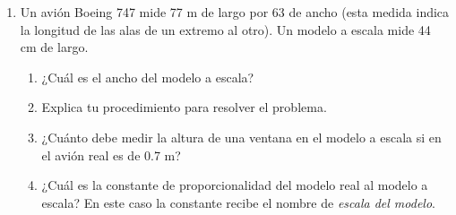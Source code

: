 \documentclass[11pt]{book}
\begin{document}
\begin{enumerate}
  \item Un avión Boeing 747 mide 77 m de largo por 63 de ancho (esta medida
        indica la longitud de las alas de un extremo al otro). Un modelo a escala
        mide 44 cm de largo.
        \begin{enumerate}
          \item ¿Cuál es el ancho del modelo a escala?
          \item Explica tu procedimiento para resolver el problema.
          \item ¿Cuánto debe medir la altura de una ventana en el modelo a escala si en el avión
                real es de 0.7 m?
          \item ¿Cuál es la constante de proporcionalidad del modelo real al modelo a escala?
                En este caso la constante recibe el nombre de \emph{escala del modelo}.
        \end{enumerate}


\end{enumerate}
\end{document}

